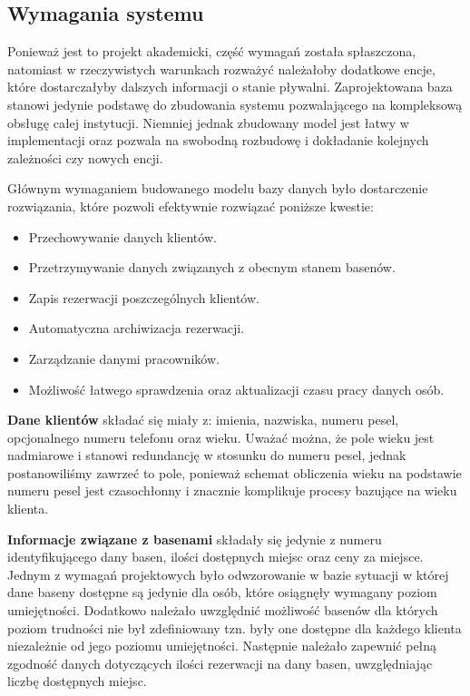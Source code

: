 \documentclass[a4paper]{article}
\begin{document}
\subsection{Wymagania systemu} \label{Wymagania}

Ponieważ jest to projekt akademicki, część wymagań została spłaszczona, natomiast w rzeczywistych warunkach rozważyć należałoby dodatkowe encje, które dostarczałyby dalszych informacji o stanie pływalni. Zaprojektowana baza stanowi jedynie podstawę do zbudowania systemu pozwalającego na kompleksową obsługę całej instytucji. Niemniej jednak zbudowany model jest łatwy w implementacji oraz pozwala na swobodną rozbudowę i dokładanie kolejnych zależności czy nowych encji.

Głównym wymaganiem budowanego modelu bazy danych było dostarczenie rozwiązania, które pozwoli efektywnie rozwiązać poniższe kwestie:
\begin{itemize}
    \item Przechowywanie danych klientów.
    \item Przetrzymywanie danych związanych z obecnym stanem basenów.
    \item Zapis rezerwacji poszczególnych klientów.
    \item Automatyczna archiwizacja rezerwacji.
    \item Zarządzanie danymi pracowników.
    \item Możliwość łatwego sprawdzenia oraz aktualizacji czasu pracy danych osób.
\end{itemize}

\textbf{Dane klientów} składać się miały z: imienia, nazwiska, numeru pesel, opcjonalnego numeru telefonu oraz wieku. Uważać można, że pole wieku jest nadmiarowe i stanowi redundancję w stosunku do numeru pesel, jednak postanowiliśmy zawrzeć to pole, ponieważ schemat obliczenia wieku na podstawie numeru pesel jest czasochłonny i znacznie komplikuje procesy bazujące na wieku klienta.

\textbf{Informacje związane z basenami} składały się jedynie z numeru identyfikującego dany basen, ilości dostępnych miejsc oraz ceny za miejsce. Jednym z wymagań projektowych było odwzorowanie w bazie sytuacji w której dane baseny dostępne są jedynie dla osób, które osiągnęły wymagany poziom umiejętności. Dodatkowo należało uwzględnić możliwość basenów dla których poziom trudności nie był zdefiniowany tzn. były one dostępne dla każdego klienta niezależnie od jego poziomu umiejętności. Następnie należało zapewnić pełną zgodność danych dotyczących ilości rezerwacji na dany basen, uwzględniając liczbę dostępnych miejsc.
\end{document}
